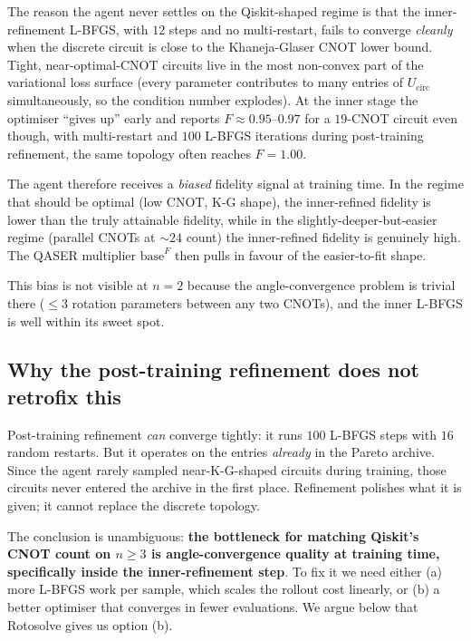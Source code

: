 \documentclass[11pt,a4paper]{article}
\newcommand{\Ucirc}{U_{\text{circ}}}
\begin{document}
The reason the agent never settles on the Qiskit-shaped regime is that
the inner-refinement L-BFGS, with $12$ steps and no multi-restart, fails
to converge \emph{cleanly} when the discrete circuit is close to the
Khaneja-Glaser CNOT lower bound. Tight, near-optimal-CNOT circuits live
in the most non-convex part of the variational loss surface (every
parameter contributes to many entries of $\Ucirc$ simultaneously, so the
condition number explodes). At the inner stage the optimiser ``gives up''
early and reports $F \approx 0.95$--$0.97$ for a $19$-CNOT circuit even
though, with multi-restart and $100$ L-BFGS iterations during post-training
refinement, the same topology often reaches $F = 1.00$.

The agent therefore receives a \emph{biased} fidelity signal at training
time. In the regime that should be optimal (low CNOT, K-G shape), the
inner-refined fidelity is lower than the truly attainable fidelity, while
in the slightly-deeper-but-easier regime (parallel CNOTs at $\sim 24$
count) the inner-refined fidelity is genuinely high. The QASER multiplier
$\text{base}^F$ then pulls in favour of the easier-to-fit shape.

This bias is not visible at $n = 2$ because the angle-convergence problem
is trivial there ($\le 3$ rotation parameters between any two CNOTs),
and the inner L-BFGS is well within its sweet spot.

\subsection{Why the post-training refinement does not retrofix this}

Post-training refinement \emph{can} converge tightly: it runs $100$
L-BFGS steps with $16$ random restarts. But it operates on the entries
\emph{already} in the Pareto archive. Since the agent rarely sampled
near-K-G-shaped circuits during training, those circuits never entered
the archive in the first place. Refinement polishes what it is given;
it cannot replace the discrete topology.

The conclusion is unambiguous: \textbf{the bottleneck for matching
Qiskit's CNOT count on $n \ge 3$ is angle-convergence quality at training
time, specifically inside the inner-refinement step}. To fix it we need
either (a) more L-BFGS work per sample, which scales the rollout cost
linearly, or (b) a better optimiser that converges in fewer evaluations.
We argue below that Rotosolve gives us option (b).

\end{document}

